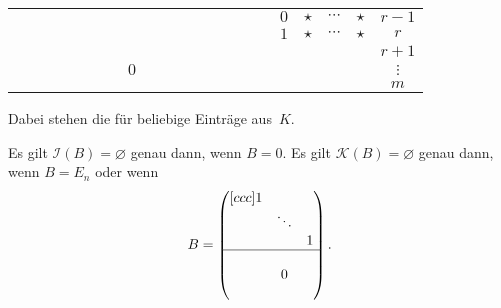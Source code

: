 \documentclass[a4paper]{article}
\begin{document}
\begin{center}
\begin{tabular}{|cccccccccccccccccccc|c}
                                &          &     &                           &         &          &         &                           &         &          &         &                           &         &          &         & \multicolumn{1}{|c}{}         & \multicolumn{1}{|c|}{$0$}      & $\star$  & $\cdots$ & $\star$                 & $r-1$    \\ \cline{16-16}
                                &          &     &                           &         &          &         &                           &         &          &         &                           &         &          &         &                               & \multicolumn{1}{|c|}{$1$}      & $\star$  & $\cdots$ & $\star$                 & $r$      \\ \cline{1-20}
                                &          &     &                           &         &          &         &                           &         &          &         &                           &         &          &         &                               &                                &          &          &                         & $r+1$    \\
                                &          &     &                           &         &          &         & $0$                       &         &          &         &                           &         &          &         &                               &                                &          &          &                         & $\vdots$ \\
                                &          &     &                           &         &          &         &                           &         &          &         &                           &         &          &         &                               &                                &          &          &                         & $m$      \\ \cline{1-20}
    \end{tabular}
\end{center}
Dabei stehen die für beliebige Einträge aus~$K$.

\begin{remark}
    Es gilt $\mathcal{I}(B) = \varnothing$ genau dann, wenn $B = 0$. Es gilt $\mathcal{K}(B) = \varnothing$ genau dann, wenn $B = E_n$ oder wenn
    \begin{equation*}
        B = \begin{pmatrix}[ccc]
            1 &        &   \\
              & \ddots &   \\
              &        & 1 \\ \hline
              &        &   \\
              & 0      &   \\
              &        &
        \end{pmatrix}.
    \end{equation*}
\end{remark}
\end{document}
